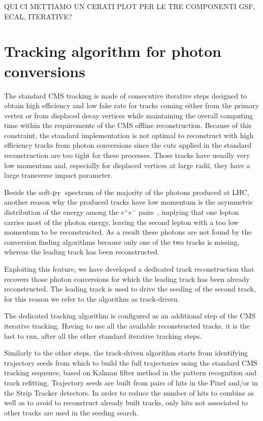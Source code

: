 \documentclass[a4paper]{jpconf}
\def \pt{$\p_{\rm T}$~}
\begin{document}
QUI CI METTIAMO UN CERATI PLOT PER LE TRE COMPONENTI GSF, ECAL, ITERATIVE?


\section{Tracking algorithm for photon conversions}
\label{sec:newSeedingStep}
 

The standard CMS tracking is made of consecutive iterative steps designed to obtain high efficiency and low fake rate for
tracks coming either from the primary vertex or from displaced decay
vertices while maintaining the overall computing time within the
requirements of the CMS offline reconstruction.
Because of this constraint, the standard implementation is not optimal
to reconstruct with high efficiency tracks from photon conversions
since the cuts applied in the standard
reconstruction are too tight for these processes. Those
tracks have usually very low momentum and, especially for displaced
vertices at large radii, they have a large transverse impact parameter.

Beside the soft-\pt spectrum of the majority of the photons produced at LHC, another reason why the produced tracks have low momentum is the asymmetric distribution of the energy among the $e^+e^-$ pairs~\cite{pdg}, implying that one lepton carries most of the photon energy, leaving the second lepton with a too low momentum to be reconstructed. As a result these photons are not found by the conversion finding algorithms because only one of the two tracks is missing, whereas the leading track has been reconstructed.

Exploiting this feature, we have developed a dedicated track reconstruction that recovers those photon conversions for which the 
leading  track has been already reconstructed. The leading track is used to drive the seeding of the second track, for this reason we refer to the algorithm as track-driven.

The dedicated tracking algorithm is configured as an additional step of the CMS iterative tracking. Having to use all the available reconstructed tracks, it is the last to run, after all the other standard iterative tracking steps.

Similarly to  the other steps, the track-driven algorithm starts from identifying trajectory seeds from which to build the full trajectories using the standard CMS tracking sequence, based on Kalman filter method in the pattern recognition and track refitting.
Trajectory seeds are built from pairs of hits
in the Pixel and/or in the Strip Tracker detectors. 
In order to reduce the number of hits to combine as well as to avoid to reconstruct already built tracks,  only hits not associated to other tracks are used in the seeding search.
\end{document}
